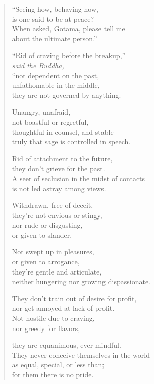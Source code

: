 \documentclass[12pt,openany]{book}%
\newcommand*{\scspeaker}[1]{\hspace{2em}\textit{#1}}
\begin{document}
\begin{verse}%
“Seeing how, behaving how, \\
is one said to be at peace? \\
When asked, Gotama, please tell me \\
about the ultimate person.” 

“Rid of craving before the breakup,” \\
\scspeaker{said the Buddha, }\\
“not dependent on the past, \\
unfathomable in the middle, \\
they are not governed by anything. 

Unangry, unafraid, \\
not boastful or regretful, \\
thoughtful in counsel, and stable—\\
truly that sage is controlled in speech. 

Rid of attachment to the future, \\
they don’t grieve for the past. \\
A seer of seclusion in the midst of contacts \\
is not led astray among views. 

Withdrawn, free of deceit, \\
they’re not envious or stingy, \\
nor rude or disgusting, \\
or given to slander. 

Not swept up in pleasures, \\
or given to arrogance, \\
they’re gentle and articulate, \\
neither hungering nor growing dispassionate. 

They don’t train out of desire for profit, \\
nor get annoyed at lack of profit. \\
Not hostile due to craving, \\
nor greedy for flavors, 

they are equanimous, ever mindful. \\
They never conceive themselves in the world \\
as equal, special, or less than; \\
for them there is no pride. 


\end{verse}
\end{document}
